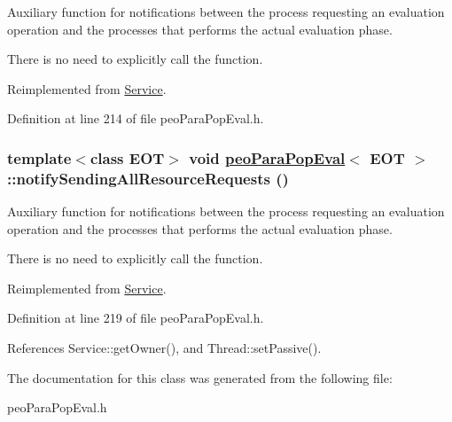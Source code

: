 Auxiliary function for notifications between the process requesting an evaluation operation and the processes that performs the actual evaluation phase. 

There is no need to explicitly call the function. 

Reimplemented from \hyperlink{classService_81ad4d6ebb50045b8977e2ab74826f30}{Service}.

Definition at line 214 of file peo\-Para\-Pop\-Eval.h.\hypertarget{classpeoParaPopEval_b77031fc4807921ffaf7cf6b669a7665}{
\subsubsection[notifySendingAllResourceRequests]{\setlength{\rightskip}{0pt plus 5cm}template$<$class EOT$>$ void \hyperlink{classpeoParaPopEval}{peo\-Para\-Pop\-Eval}$<$ EOT $>$::notify\-Sending\-All\-Resource\-Requests ()}}
\label{classpeoParaPopEval_b77031fc4807921ffaf7cf6b669a7665}


Auxiliary function for notifications between the process requesting an evaluation operation and the processes that performs the actual evaluation phase. 

There is no need to explicitly call the function. 

Reimplemented from \hyperlink{classService_f94cc8a5c2665d4574041737e61e9ffc}{Service}.

Definition at line 219 of file peo\-Para\-Pop\-Eval.h.

References Service::get\-Owner(), and Thread::set\-Passive().

The documentation for this class was generated from the following file:\begin{CompactItemize}
\item 
peo\-Para\-Pop\-Eval.h\end{CompactItemize}
